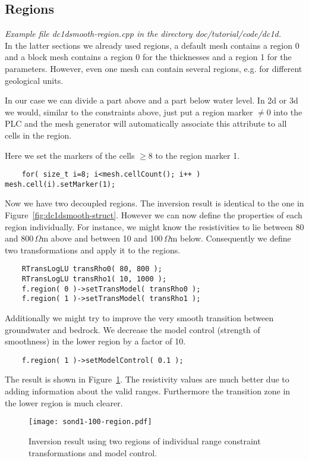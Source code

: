 \subsection{Regions}\label{sec:dc1dregion}
{\em Example file dc1dsmooth-region.cpp in the directory doc/tutorial/code/dc1d.}\\
In the latter sections we already used regions, a default mesh contains a region 0 and a block mesh contains a region 0 for the thicknesses and a region 1 for the parameters.
However, even one mesh can contain several regions, e.g. for different geological units.

In our case we can divide a part above and a part below water level.
In 2d or 3d we would, similar to the constraints above, just put a region marker $\neq 0$ into the PLC and the mesh generator will automatically associate this attribute to all cells in the region.

Here we set the markers of the cells $\geq8$ to the region marker 1.
\begin{lstlisting}
    for( size_t i=8; i<mesh.cellCount(); i++ ) mesh.cell(i).setMarker(1);
\end{lstlisting}

Now we have two decoupled regions. The inversion result is identical to the one in Figure~\ref{fig:dc1dsmooth-struct}.
However we can now define the properties of each region individually.
For instance, we might know the resistivities to lie between 80 and 800\,$\Omega$m above and between 10 and 100\,$\Omega$m below.
Consequently we define two transformations and apply it to the regions.
\begin{lstlisting}
    RTransLogLU transRho0( 80, 800 );
    RTransLogLU transRho1( 10, 1000 );
    f.region( 0 )->setTransModel( transRho0 );
    f.region( 1 )->setTransModel( transRho1 );
\end{lstlisting}

Additionally we might try to improve the very smooth transition between groundwater and bedrock.
We decrease the model control (strength of smoothness) in the lower region by a factor of 10.
\begin{lstlisting}
    f.region( 1 )->setModelControl( 0.1 );
\end{lstlisting}

The result is shown in Figure~\ref{fig:dc1dsmooth-region}.
The resistivity values are much better due to adding information about the valid ranges.
Furthermore the transition zone in the lower region is much clearer.
\begin{figure}[htbp]
\centering\texttt{[image: sond1-100-region.pdf]}
\caption{Inversion result using two regions of individual range constraint transformations and model control.}\label{fig:dc1dsmooth-region}
\end{figure}

